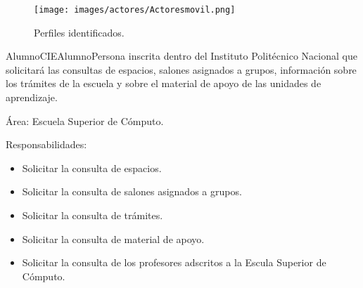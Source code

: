     \begin{figure}[h!]
	\begin{center}
		\texttt{[image: images/actores/Actoresmovil.png]}
		\caption{Perfiles identificados.}
		\label{fig:perfilesMovil}
	\end{center}
\end{figure}
    \begin{actor}{Alumno}{CIEAlumno}{Persona inscrita dentro del Instituto Politécnico Nacional que solicitará las consultas de espacios, salones asignados a grupos, información sobre los trámites de la escuela y sobre el material de apoyo de las unidades de aprendizaje.}

	\item[Área:] Escuela Superior de Cómputo.

	\item[Responsabilidades:] \hspace{1pt}
	
		\begin{itemize}

		    \item Solicitar la consulta de espacios.
		    \item Solicitar la consulta de salones asignados a grupos.
		    \item Solicitar la consulta de trámites.
		    \item Solicitar la consulta de material de apoyo.
		    \item Solicitar la consulta de los profesores adscritos a la Escula Superior de Cómputo.


\end{itemize}
\end{actor}
